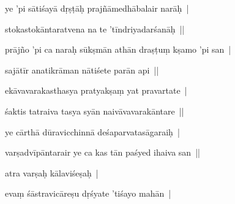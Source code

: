 \documentclass[article,12pt,a4paper]{memoir}%
\newcounter{parCount}
\begin{document}
	  
	  \pstart \leavevmode%
	ye 'pi sātiśayā dṛṣṭāḥ prajñāmedhābalair narāḥ | 
	{}
	\pend%
      

	  
	  \pstart \leavevmode%
	stokastokāntaratvena na te 'tīndriyadarśanāḥ || 
	{}
	\pend%
      

	  
	  \pstart \leavevmode%
	prājño 'pi ca naraḥ sūkṣmān athān draṣṭuṃ kṣamo 'pi san | 
	{}
	\pend%
      

	  
	  \pstart \leavevmode%
	sajātīr anatikrāman nātiśete parān api || 
	{}
	\pend%
      

	  
	  \pstart \leavevmode%
	ekāvavarakasthasya pratyakṣaṃ yat pravartate | 
	{}
	\pend%
      

	  
	  \pstart \leavevmode%
	śaktis tatraiva tasya syān naivāvavarakāntare || 
	{}
	\pend%
      

	  
	  \pstart \leavevmode%
	ye cārthā dūravicchinnā deśaparvatasāgaraiḥ | 
	{}
	\pend%
      

	  
	  \pstart \leavevmode%
	varṣadvīpāntarair ye ca kas tān paśyed ihaiva san || 
	{}
	\pend%
      

	  
	  \pstart \leavevmode%
	atra varṣaḥ kālaviśeṣaḥ | 
	{}
	\pend%
      

	  
	  \pstart \leavevmode%
	evaṃ śāstravicāreṣu dṛśyate 'tiśayo mahān | 
	{}
	\pend%
      
\end{document}
